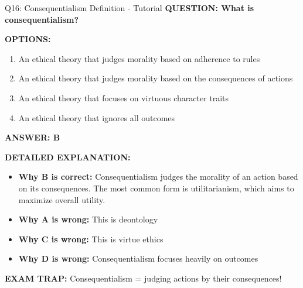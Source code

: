 \documentclass[8pt]{beamer}
\begin{document}
	\begin{frame}{Q16: Consequentialism Definition - Tutorial}
		\fontsize{6.5}{7.5}\selectfont
		\textbf{QUESTION: What is consequentialism?}
		
		\vspace{0.1cm}
		\textbf{OPTIONS:}
		\begin{enumerate}
			\item An ethical theory that judges morality based on adherence to rules
			\item An ethical theory that judges morality based on the consequences of actions
			\item An ethical theory that focuses on virtuous character traits
			\item An ethical theory that ignores all outcomes
		\end{enumerate}
		
		\vspace{0.1cm}
		\textcolor{myblue}{\textbf{ANSWER: B}}
		
		\vspace{0.1cm}
		\textbf{DETAILED EXPLANATION:}
		\begin{itemize}
			\item \textbf{Why B is correct:} Consequentialism judges the morality of an action based on its consequences. The most common form is utilitarianism, which aims to maximize overall utility.
			\item \textbf{Why A is wrong:} This is deontology
			\item \textbf{Why C is wrong:} This is virtue ethics
			\item \textbf{Why D is wrong:} Consequentialism focuses heavily on outcomes
		\end{itemize}
		
		\textcolor{myred}{\textbf{EXAM TRAP:}} Consequentialism = \textcolor{myblue}{judging actions by their consequences}!
	\end{frame}
	
\end{document}
